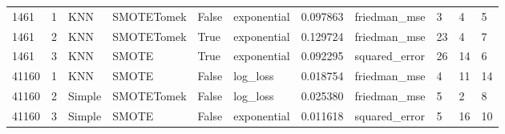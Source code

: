 \documentclass[11pt]{article}
\begin{document}
\begin{table}
\begin{tabular}{lllllllllll}
\midrule
      1461 &       1 &     KNN & SMOTETomek &  False & exponential &       0.097863 &  friedman\_mse &                     3 &                    4 &         5 \\
      1461 &       2 &     KNN & SMOTETomek &   True & exponential &       0.129724 &  friedman\_mse &                    23 &                    4 &         7 \\
      1461 &       3 &     KNN &      SMOTE &   True & exponential &       0.092295 & squared\_error &                    26 &                   14 &         6 \\
\midrule
     41160 &       1 &     KNN &      SMOTE &  False &    log\_loss &       0.018754 &  friedman\_mse &                     4 &                   11 &        14 \\
     41160 &       2 &  Simple & SMOTETomek &  False &    log\_loss &       0.025380 &  friedman\_mse &                     5 &                    2 &         8 \\
     41160 &       3 &  Simple &      SMOTE &  False & exponential &       0.011618 & squared\_error &                     5 &                   16 &        10 \\
\bottomrule
\end{tabular}
\end{table}
\end{document}
